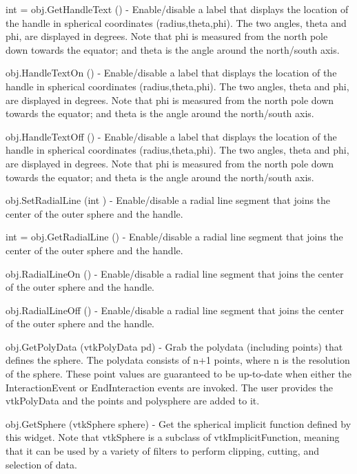 \begin{DoxyItemize}
\item {\ttfamily int = obj.\-Get\-Handle\-Text ()} -\/ Enable/disable a label that displays the location of the handle in spherical coordinates (radius,theta,phi). The two angles, theta and phi, are displayed in degrees. Note that phi is measured from the north pole down towards the equator; and theta is the angle around the north/south axis.  
\item {\ttfamily obj.\-Handle\-Text\-On ()} -\/ Enable/disable a label that displays the location of the handle in spherical coordinates (radius,theta,phi). The two angles, theta and phi, are displayed in degrees. Note that phi is measured from the north pole down towards the equator; and theta is the angle around the north/south axis.  
\item {\ttfamily obj.\-Handle\-Text\-Off ()} -\/ Enable/disable a label that displays the location of the handle in spherical coordinates (radius,theta,phi). The two angles, theta and phi, are displayed in degrees. Note that phi is measured from the north pole down towards the equator; and theta is the angle around the north/south axis.  
\item {\ttfamily obj.\-Set\-Radial\-Line (int )} -\/ Enable/disable a radial line segment that joins the center of the outer sphere and the handle.  
\item {\ttfamily int = obj.\-Get\-Radial\-Line ()} -\/ Enable/disable a radial line segment that joins the center of the outer sphere and the handle.  
\item {\ttfamily obj.\-Radial\-Line\-On ()} -\/ Enable/disable a radial line segment that joins the center of the outer sphere and the handle.  
\item {\ttfamily obj.\-Radial\-Line\-Off ()} -\/ Enable/disable a radial line segment that joins the center of the outer sphere and the handle.  
\item {\ttfamily obj.\-Get\-Poly\-Data (vtk\-Poly\-Data pd)} -\/ Grab the polydata (including points) that defines the sphere. The polydata consists of n+1 points, where n is the resolution of the sphere. These point values are guaranteed to be up-\/to-\/date when either the Interaction\-Event or End\-Interaction events are invoked. The user provides the vtk\-Poly\-Data and the points and polysphere are added to it.  
\item {\ttfamily obj.\-Get\-Sphere (vtk\-Sphere sphere)} -\/ Get the spherical implicit function defined by this widget. Note that vtk\-Sphere is a subclass of vtk\-Implicit\-Function, meaning that it can be used by a variety of filters to perform clipping, cutting, and selection of data.  

\end{DoxyItemize}
